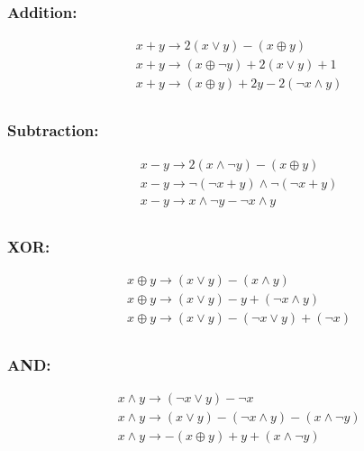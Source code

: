 \documentclass[
  digital, %
  notable,   %
  twoside, %
  nolof,     %
  nolot,     %
]{fithesis3}
\theoremstyle{definition}
\begin{document}
\subsubsection{Addition:}
$$
\begin{aligned}
&x+y \rightarrow 2(x \vee y) - (x \oplus y) \\
&x+y \rightarrow(x \oplus \neg y)+ 2( x \vee y) + 1 \\
&x+y \rightarrow(x \oplus y)+2 y-2 (\neg x \wedge y) \\
\end{aligned}
$$

\subsubsection{Subtraction:}
$$
\begin{aligned}
&x-y \rightarrow 2(x \wedge \neg y) - (x \oplus y) \\
& x - y \rightarrow \neg ( \neg x + y) \wedge \neg(\neg x + y) \\
& x - y \rightarrow x \wedge \neg y - \neg x \wedge y \\
\end{aligned}
$$

\subsubsection{XOR:}
$$
\begin{aligned}
&x \oplus y \rightarrow (x \vee y) - (x \wedge y) \\
&x \oplus y \rightarrow(x \vee y)-y+(\neg x \wedge y) \\
&x \oplus y \rightarrow(x \vee y)-(\neg x \vee y)+(\neg x) \\
\end{aligned}
$$

\subsubsection{AND:}
$$
\begin{aligned}
&x \wedge y \rightarrow (\neg x \vee y) - \neg x  \\
&x \wedge y \rightarrow(x \vee y)-(\neg x \wedge y)-(x \wedge \neg y) \\
&x \wedge y \rightarrow-(x \oplus y)+y+(x \wedge \neg y) \\
\end{aligned}
$$
\end{document}
